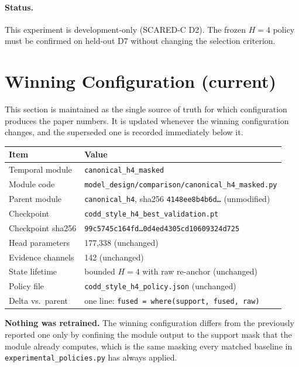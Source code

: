 \documentclass[11pt,a4paper]{article}
\begin{document}
\paragraph{Status.}
This experiment is development-only (SCARED-C D2).
The frozen $H=4$ policy must be confirmed on held-out D7 without
changing the selection criterion.

\section*{Winning Configuration (current)}

This section is maintained as the single source of truth for which
configuration produces the paper numbers. It is updated whenever the
winning configuration changes, and the superseded one is recorded
immediately below it.

\begin{center}
\begin{tabular}{ll}
\toprule
\textbf{Item} & \textbf{Value} \\
\midrule
Temporal module   & \texttt{canonical\_h4\_masked} \\
Module code       & \texttt{model\_design/comparison/canonical\_h4\_masked.py} \\
Parent module     & \texttt{canonical\_h4}, sha256 \texttt{4148ee8b4b6d\ldots} (unmodified) \\
Checkpoint        & \texttt{codd\_style\_h4\_best\_validation.pt} \\
Checkpoint sha256 & \texttt{99c5745c164fd\ldots0d4ed4305cd10609324d725} \\
Head parameters   & 177{,}338 (unchanged) \\
Evidence channels & 142 (unchanged) \\
State lifetime    & bounded $H=4$ with raw re-anchor (unchanged) \\
Policy file       & \texttt{codd\_style\_h4\_policy.json} (unchanged) \\
Delta vs.\ parent & one line: \texttt{fused = where(support, fused, raw)} \\
\bottomrule
\end{tabular}
\end{center}

\textbf{Nothing was retrained.} The winning configuration differs from
the previously reported one only by confining the module output to the
support mask that the module already computes, which is the same
masking every matched baseline in \texttt{experimental\_policies.py}
has always applied.
\end{document}
